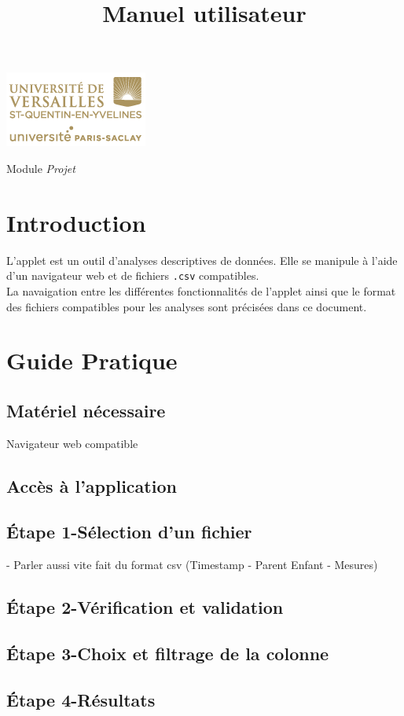

\title{\vspace{\fill}\textbf{\Huge Manuel utilisateur}}


\clearpage
\maketitle\vspace{9em}
\begin{center}\includegraphics[scale=0.7]{../Cahier/logo.png}\end{center}
\begin{flushright}Module \textit{Projet}\end{flushright}
\newpage
\tableofcontents
\newpage\clearpage{}

\section{Introduction}
	L'applet est un outil d'analyses descriptives de données. Elle se manipule à l'aide d'un navigateur web et de fichiers \lstinline!.csv! compatibles.\\
	La navaigation entre les différentes fonctionnalités de l'applet ainsi que le format des fichiers compatibles pour les analyses sont précisées dans ce document.
	
\section{Guide Pratique}
	\subsection{Matériel nécessaire}
		Navigateur web compatible
	\subsection{Accès à l'application}
	\subsection{Étape 1-Sélection d'un fichier}
		- Parler aussi vite fait du format csv (Timestamp - Parent Enfant - Mesures)
	\subsection{Étape 2-Vérification et validation}
	\subsection{Étape 3-Choix et filtrage de la colonne}
	\subsection{Étape 4-Résultats}
		
	

